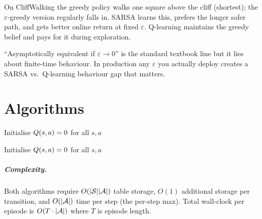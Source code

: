 \documentclass[11pt,oneside]{scrbook}
\begin{document}
On CliffWalking the greedy policy walks one square above the cliff (shortest); the
$\varepsilon$-greedy version regularly falls in. SARSA learns this, prefers the longer
safer path, and gets better online return at fixed $\varepsilon$. Q-learning maintains the
greedy belief and pays for it during exploration.

\begin{pitfall}
``Asymptotically equivalent if $\varepsilon\to 0$'' is the standard textbook line but it
lies about finite-time behaviour. In production any $\varepsilon$ you actually deploy
creates a SARSA vs.\ Q-learning behaviour gap that matters.
\end{pitfall}

\chapter{Algorithms}

\begin{algorithm}[H]
\caption{SARSA (on-policy TD control)}
Initialise $Q(s,a) = 0$ for all $s,a$\;
\end{algorithm}

\begin{algorithm}[H]
\caption{Q-learning (off-policy TD control)}
Initialise $Q(s,a) = 0$ for all $s,a$\;
\end{algorithm}

\paragraph{Complexity.} Both algorithms require $O(|\mathcal{S}||\mathcal{A}|)$ table storage, $O(1)$
additional storage per transition, and $O(|\mathcal{A}|)$ time
per step (the per-step max). Total wall-clock per episode is $O(T \cdot |\mathcal{A}|)$
where $T$ is episode length.
\end{document}
